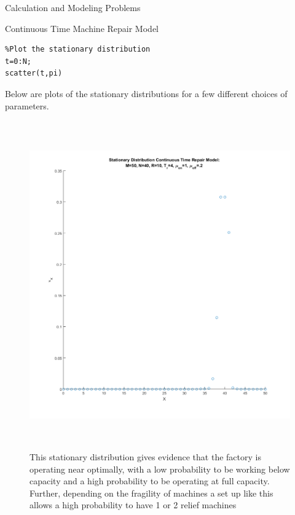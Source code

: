 \documentclass[12pt]{article}
\numberwithin{equation}{section}
\begin{document}
\begin{section}{Calculation and Modeling Problems}
\begin{subsection}{Continuous Time Machine Repair Model}
\begin{enumerate}
\begin{lstlisting}
%Plot the stationary distribution
t=0:N;
scatter(t,pi)
\end{lstlisting}
Below are plots of the stationary distributions for a few different choices of parameters.
\end{enumerate}
\begin{figure}
  \centering
  \includegraphics[width=400pt,height=400pt,keepaspectratio]{RepairModelStationaryDist1.png}
  \caption{This stationary distribution gives evidence that the factory is operating near optimally, with a low probability to be working below capacity and a high probability to be operating at full capacity. Further, depending on the fragility of machines a set up like this allows a high probability to have 1 or 2 relief machines}
\end{figure}
\begin{figure}
\centering

\end{figure}
\end{subsection}
\end{section}
\end{document}
